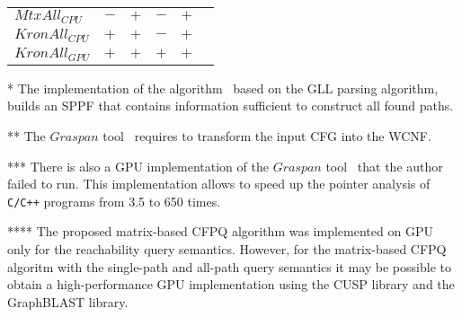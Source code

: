 \begin{table} [h]
\begin{threeparttable}
\begin{tabular}{| p{3.5cm} || p{3.2cm} | p{2.6cm} | p{2.6cm} | p{2.4cm}l |}
  $\textit{MtxAll}_{\textit{CPU}}$                           &\centering  $-$                  &\centering  $+$             &\centering  $-$\tnote{****}  &\centering  $+$   &\\
  $\textit{KronAll}_{\textit{CPU}}$                      &\centering  $+$                  &\centering  $+$             &\centering  $-$  &\centering  $+$    &\\
  $\textit{KronAll}_{\textit{GPU}}$                      &\centering  $+$                  &\centering  $+$             &\centering  $+$  &\centering  $+$    &\\
  \hline
  \hline
  \end{tabular}\small{
  \begin{tablenotes}
            \item[*] The implementation of the algorithm~\cite{grigorev2017context} based on the GLL parsing algorithm, builds an SPPF that contains information sufficient to construct all found paths.
            \item[**] The $\textit{Graspan}$ tool~\cite{graspan} requires to transform the input CFG into the WCNF.
            \item[***] There is also a GPU implementation of the $\textit{Graspan}$ tool~\cite{graspan} that the author failed to run. This implementation allows to speed up the pointer analysis of \texttt{C/C++} programs from 3.5 to 650 times.
            \item[****] The proposed matrix-based CFPQ algorithm was implemented on GPU only for the reachability query semantics. However, for the matrix-based CFPQ algoritm with the single-path and all-path query semantics it may be possible to obtain a high-performance GPU implementation using the CUSP library and the GraphBLAST library.
  \end{tablenotes}    }
  \end{threeparttable}
\end{table}


\clearpage